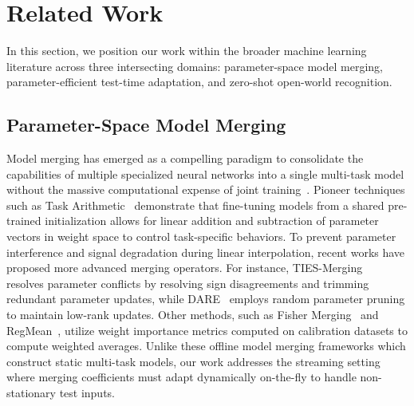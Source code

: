 \documentclass{article}
\theoremstyle{plain}
\theoremstyle{definition}
\theoremstyle{remark}
\begin{document}
\section{Related Work}
\label{sec:related}

In this section, we position our work within the broader machine learning literature across three intersecting domains: parameter-space model merging, parameter-efficient test-time adaptation, and zero-shot open-world recognition.

\subsection{Parameter-Space Model Merging}
Model merging has emerged as a compelling paradigm to consolidate the capabilities of multiple specialized neural networks into a single multi-task model without the massive computational expense of joint training~\cite{wortsman22, ilharco23}. Pioneer techniques such as Task Arithmetic~\cite{ilharco23} demonstrate that fine-tuning models from a shared pre-trained initialization allows for linear addition and subtraction of parameter vectors in weight space to control task-specific behaviors. To prevent parameter interference and signal degradation during linear interpolation, recent works have proposed more advanced merging operators. For instance, TIES-Merging~\cite{yadav23} resolves parameter conflicts by resolving sign disagreements and trimming redundant parameter updates, while DARE~\cite{yu24dare} employs random parameter pruning to maintain low-rank updates. Other methods, such as Fisher Merging~\cite{matena22} and RegMean~\cite{jin23regmean}, utilize weight importance metrics computed on calibration datasets to compute weighted averages. Unlike these offline model merging frameworks which construct static multi-task models, our work addresses the streaming setting where merging coefficients must adapt dynamically on-the-fly to handle non-stationary test inputs.
\end{document}
